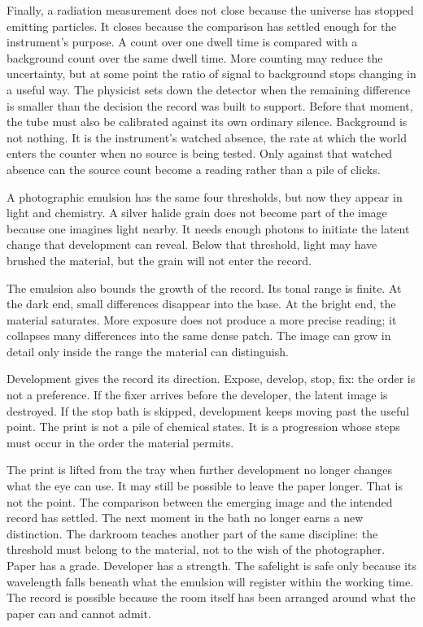 Finally, a radiation measurement does not close because the universe has
stopped emitting particles. It closes because the comparison has settled
enough for the instrument's purpose. A count over one dwell time is compared
with a background count over the same dwell time. More counting may reduce the
uncertainty, but at some point the ratio of signal to background stops changing
in a useful way. The physicist sets down the detector when the remaining
difference is smaller than the decision the record was built to support.
Before that moment, the tube must also be calibrated against its own ordinary
silence. Background is not nothing. It is the instrument's watched absence, the
rate at which the world enters the counter when no source is being tested.
Only against that watched absence can the source count become a reading rather
than a pile of clicks.

A photographic emulsion has the same four thresholds, but now they appear in
light and chemistry. A silver halide grain does not become part of the image
because one imagines light nearby. It needs enough photons to initiate the
latent change that development can reveal. Below that threshold, light may
have brushed the material, but the grain will not enter the record.

The emulsion also bounds the growth of the record. Its tonal range is finite.
At the dark end, small differences disappear into the base. At the bright end,
the material saturates. More exposure does not produce a more precise reading;
it collapses many differences into the same dense patch. The image can grow in
detail only inside the range the material can distinguish.

Development gives the record its direction. Expose, develop, stop, fix: the
order is not a preference. If the fixer arrives before the developer, the
latent image is destroyed. If the stop bath is skipped, development keeps
moving past the useful point. The print is not a pile of chemical states. It
is a progression whose steps must occur in the order the material permits.

The print is lifted from the tray when further development no longer changes
what the eye can use. It may still be possible to leave the paper longer. That
is not the point. The comparison between the emerging image and the intended
record has settled. The next moment in the bath no longer earns a new
distinction.
The darkroom teaches another part of the same discipline: the threshold must
belong to the material, not to the wish of the photographer. Paper has a grade.
Developer has a strength. The safelight is safe only because its wavelength
falls beneath what the emulsion will register within the working time. The
record is possible because the room itself has been arranged around what the
paper can and cannot admit.

